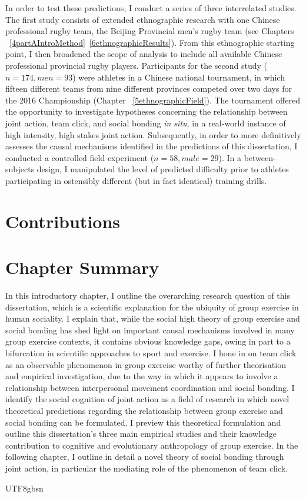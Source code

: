 \begin{CJK}{UTF8}{gbsn}
In order to test these predictions, I conduct a series of three interrelated studies.  The first study consists of extended ethnographic research with one Chinese professional rugby team, the Beijing Provincial men's rugby team (see Chapters ~\ref{4partAIntroMethod}\nobreakdash~\ref{6ethnographicResults}). From this ethnographic starting point, I then broadened the scope of analysis to include all available Chinese professional provincial rugby players. Participants for the second study ($n = 174, men = 93$) were athletes in a Chinese national tournament, in which fifteen different teams from nine different provinces competed over two days for the 2016 Championship (Chapter ~\ref{5ethnographicField}).  The tournament offered the opportunity to investigate hypotheses concerning the relationship between joint action, team click, and social bonding \textit{in situ}, in a real-world instance of high intensity, high stakes joint action.  Subsequently, in order to more definitively assesses the causal mechanisms identified in the predictions of this dissertation, I conducted a controlled field experiment ($n = 58, male = 29$). In a between-subjects design, I manipulated the level of predicted difficulty prior to athletes participating in ostensibly different (but in fact identical) training drills.

\section{Contributions}




\section{Chapter Summary}
In this introductory chapter, I outline the overarching research question of this dissertation, which is a scientific explanation for the ubiquity of group exercise in human sociality.  I explain that, while the social high theory of group exercise and social bonding has shed light on important causal mechanisms involved in many group exercise contexts, it contains obvious knowledge gaps, owing in part to a bifurcation in scientific approaches to sport and exercise.  I hone in on team click as an observable phenomenon in group exercise worthy of further theorisation and empirical investigation, due to the way in which it appears to involve a relationship between interpersonal movement coordination and social bonding.  I identify the social cognition of joint action as a field of research in which novel theoretical predictions regarding the relationship between group exercise and social bonding can be formulated.  I preview this theoretical formulation and outline this dissertation's three main empirical studies and their knowledge contribution to cognitive and evolutionary anthropology of group exercise.  In the following chapter, I outline in detail a novel theory of social bonding through joint action, in particular the mediating role of the phenomenon of team click.





                                              \end{CJK}{UTF8}{gbsn}
